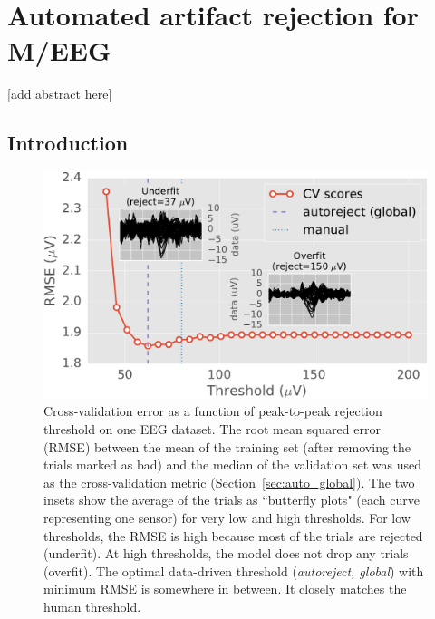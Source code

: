 \chapter{Automated artifact rejection for M/EEG}
\label{chapter:autoreject}

[add abstract here]

\noindent{}%

\section{Introduction}
\label{sec:introduction}

\begin{figure}[t]
	\centering
	\includegraphics[width=0.55\linewidth]{figures/figure1.pdf}
    \caption[Cross-validation error as a function of peak-to-peak rejection threshold on one EEG dataset.]{Cross-validation error as a function of peak-to-peak rejection threshold on one EEG dataset. The root mean squared error (RMSE) between the mean of the training set (after removing the trials marked as bad) and the median of the validation set was used as the cross-validation metric (Section~\ref{sec:auto_global}). The two insets show the average of the trials as ``butterfly plots" (each curve representing one sensor) for very low and high thresholds. For low thresholds, the RMSE is high because most of the trials are rejected (underfit). At high thresholds, the model does not drop any trials (overfit). The optimal data-driven threshold (\emph{autoreject, global}) with minimum RMSE is somewhere in between. It closely matches the human threshold.}
    \label{fig:cross_val}
\end{figure}

